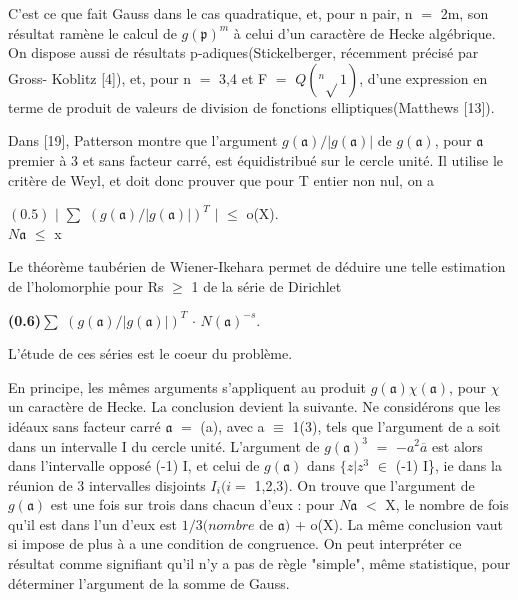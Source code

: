 \documentclass[10pt,a4paper]{article}
\begin{document}
\clearpage
{}
\label{d035-physical-003}
\par C'est ce que fait Gauss dans le cas quadratique, et, pour n pair, n $=$ 2m, son résultat ramène le calcul de $g(\mathfrak{p})^m$ à celui d'un caractère de Hecke algébrique. On dispose aussi de résultats p-adiques(Stickelberger, récemment précisé par Gross- Koblitz [4]), et, pour n $=$ 3,4 et F $=$ $Q(^{n}\sqrt{}1)$, d'une expression en terme de produit de valeurs de division de fonctions elliptiques(Matthews [13]).\par
\par Dans [19], Patterson montre que l'argument $g(\mathfrak{a})/|g(\mathfrak{a})|$ de $g(\mathfrak{a})$, pour $\mathfrak{a}$ premier à 3 et sans facteur carré, est équidistribué sur le cercle unité. Il utilise le critère de Weyl, et doit donc prouver que pour T entier non nul, on a\par
\par\smallskip\begin{center}\begin{minipage}{0.96\textwidth}\centering
$(0.5)$ $|$ $\sum{}$ $(g(\mathfrak{a})/|g(\mathfrak{a})|)^T$ $|$ $\le{}$ o(X). \\ $N\mathfrak{a}$ $\le{}$ x
\end{minipage}\end{center}\smallskip
\par Le théorème taubérien de Wiener-Ikehara permet de déduire une telle estimation de l'holomorphie pour Rs $\ge{}$ 1 de la série de Dirichlet\par
\par\noindent\textbf{(0.6)}\quad $\sum{}$ $(g(\mathfrak{a})/|g(\mathfrak{a})|)^T$ $\cdot{}$ $N(\mathfrak{a})^{-s}$.\par
\par L'étude de ces séries est le coeur du problème.\par
\par En principe, les mêmes arguments s'appliquent au produit $g(\mathfrak{a})\chi{}(\mathfrak{a})$, pour $\chi{}$ un caractère de Hecke. La conclusion devient la suivante. Ne considérons que les idéaux sans facteur carré $\mathfrak{a}$ $=$ (a), avec a $\equiv{}$ 1(3), tels que l'argument de a soit dans un intervalle I du cercle unité. L'argument de $g(\mathfrak{a})^3$ $=$ $-a^2\overline{a}$ est alors dans l'intervalle opposé (-1) I, et celui de $g(\mathfrak{a})$ dans $\{z|z^3$ $\in{}$ (-1) I\}, ie dans la réunion de 3 intervalles disjoints $I_i(i=$ 1,2,3). On trouve que l'argument de $g(\mathfrak{a})$ est une fois sur trois dans chacun d'eux : pour $N\mathfrak{a}$ $<$ X, le nombre de fois qu'il est dans l'un d'eux est $1/3(nombre$ de $\mathfrak{a})$ + o(X). La même conclusion vaut si impose de plus à a une condition de congruence. On peut interpréter ce résultat comme signifiant qu'il n'y a pas de règle "simple", même statistique, pour déterminer l'argument de la somme de Gauss.\par
\end{document}
